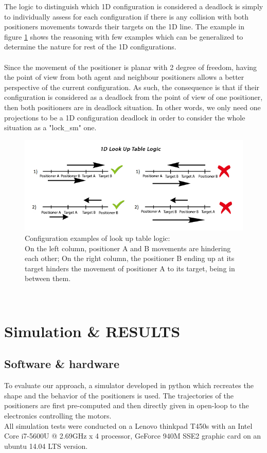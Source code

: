 \documentclass[]{spie}  %
\begin{document}
	The logic to distinguish which 1D configuration is considered a deadlock is simply to individually assess for each configuration if there is any collision with both positioners movements towards their targets on the 1D line. The example in figure \ref{look_UpTableLogic} shows the reasoning with few examples which can be generalized to determine the nature for rest of the 1D configurations.\\\\
		Since the movement of the positioner is planar with 2 degree of freedom, having the point of view from both agent and neighbour positioners allows a better perspective of the current configuration. As such, the consequence is that if their configuration is considered as a deadlock from the point of view of one positioner, then both positioners are in deadlock situation. In other words, we only need one projections to be a 1D configuration deadlock in order to consider the whole situation as a "lock\_sm" one. 	
	\begin{figure}[H]
		\centering
		\includegraphics[scale=0.50]{images/1DLookUpTable.jpg}
		\caption{\centering
			 Configuration examples of look up table logic:\\
			On the left column, positioner A and B movements are hindering each other; 
			On the right column,  the positioner B ending up at its target  hinders the movement of positioner A to its target, being in between them. }
		\label{look_UpTableLogic}
	\end{figure}\\ 
	\section{Simulation \& RESULTS}
	\label{RESULTS}
	\subsection{Software \& hardware}
	\label{Software Hardware}
	To evaluate our approach, a simulator developed in python which recreates the shape and the behavior of the positioners is used. The trajectories of the positioners are first pre-computed and then directly given in open-loop to the electronics controlling the motors.\\  
	All simulation tests were conducted on a Lenovo thinkpad T450s with an Intel Core i7-5600U @ 2.69GHz x 4 processor, GeForce 940M SSE2 graphic card on an ubuntu 14.04 LTS version.
\end{document}
